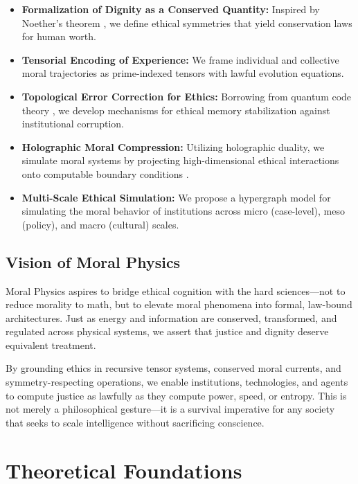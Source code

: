 \documentclass{article}
\theoremstyle{plain}
\theoremstyle{claimstyle}
\begin{document}
\begin{itemize}
    \item \textbf{Formalization of Dignity as a Conserved Quantity:} Inspired by Noether's theorem \citep{Noether1918}, we define ethical symmetries that yield conservation laws for human worth.
    \item \textbf{Tensorial Encoding of Experience:} We frame individual and collective moral trajectories as prime-indexed tensors with lawful evolution equations.
    \item \textbf{Topological Error Correction for Ethics:} Borrowing from quantum code theory \citep{Kitaev2003}, we develop mechanisms for ethical memory stabilization against institutional corruption.
    \item \textbf{Holographic Moral Compression:} Utilizing holographic duality, we simulate moral systems by projecting high-dimensional ethical interactions onto computable boundary conditions \citep{Maldacena1998}.
    \item \textbf{Multi-Scale Ethical Simulation:} We propose a hypergraph model for simulating the moral behavior of institutions across micro (case-level), meso (policy), and macro (cultural) scales.
\end{itemize}

\subsection{Vision of Moral Physics}

Moral Physics aspires to bridge ethical cognition with the hard sciences—not to reduce morality to math, but to elevate moral phenomena into formal, law-bound architectures. Just as energy and information are conserved, transformed, and regulated across physical systems, we assert that justice and dignity deserve equivalent treatment.

By grounding ethics in recursive tensor systems, conserved moral currents, and symmetry-respecting operations, we enable institutions, technologies, and agents to compute justice as lawfully as they compute power, speed, or entropy. This is not merely a philosophical gesture—it is a survival imperative for any society that seeks to scale intelligence without sacrificing conscience.

\section{Theoretical Foundations}
\end{document}
